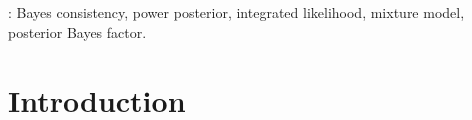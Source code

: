 \documentclass[11pt]{article}
\theoremstyle{plain}
\theoremstyle{definition}
\theoremstyle{remark}
\begin{document}
:
Bayes consistency,
power posterior,
integrated likelihood,
mixture model,
posterior Bayes factor.




\section{Introduction} 








\end{document}

